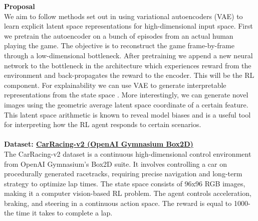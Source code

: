 \documentclass[12pt]{article}
\begin{document}
\noindent \textbf{Proposal}\\
We aim to follow methods set out in \cite{gebauer_pitfall_2021} using variational autoencoders (VAE) to learn explicit latent space representations for high-dimensional input space.
First we pretrain the autoencoder on a bunch of episodes from an actual human playing the game.
The objective is to reconstruct the game frame-by-frame through a low-dimensional bottleneck. 
After pretraining we append a new neural network to the bottleneck in the architecture which experiences reward from the environment and back-propagates the reward to the encoder.
This will be the RL component.
For explainability we can use VAE to generate interpretable representations from the state space \cite{white_sampling_2016}.
More interestingly, we can generate novel images using the geometric average latent space coordinate of a certain feature. 
This latent space arithmetic is known to reveal model biases and is a useful tool for interpreting how the RL agent responds to certain scenarios.
\\\\
\noindent \textbf{Dataset: \href{https://gymnasium.farama.org/environments/box2d/car_racing/}{CarRacing-v2 (OpenAI Gymnasium Box2D)}}\\
The CarRacing-v2 dataset is a continuous high-dimensional control environment from OpenAI Gymnasium’s Box2D suite. It involves controlling a car on procedurally generated racetracks, requiring precise navigation and long-term strategy to optimize lap times. The state space consists of 96x96 RGB images, making it a computer vision-based RL problem. The agent controls acceleration, braking, and steering in a continuous action space. The reward is equal to 1000-the time it takes to complete a lap.
\end{document}
